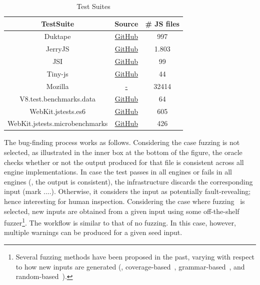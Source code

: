 \documentclass[10pt,conference,anonymous]{IEEEtran}
\begin{document}
\begin{table}[h]
  \centering
  \caption{\label{tab:test-suites}Test Suites}
  \begin{tabular}{ccc}
    \toprule
    TestSuite & Source & \# JS files \\
    \midrule
    Duktape & \href{https://github.com/svaarala/duktape}{GitHub} & 997 \\
    JerryJS & \href{https://github.com/jerryscript-project/jerryscript}{GitHub} & 1.803 \\
    JSI & \href{https://github.com/technosaurus/jsish}{GitHub} & 99 \\
    Tiny-js & \href{https://github.com/gfwilliams/tiny-js}{GitHub} & 44 \\
    Mozilla & \href{-}{-} & 32414 \\
    V8.test.benchmarks.data & \href{https://github.com/svaarala/duktape/tree/master/tests/ecmascript}{GitHub} & 64 \\
    WebKit.jstests.es6 & \href{https://github.com/svaarala/duktape/tree/master/tests/ecmascript}{GitHub} & 605 \\
    WebKit.jstests.microbenchmarks & \href{https://github.com/svaarala/duktape/tree/master/tests/ecmascript}{GitHub} & 426 \\
   \bottomrule     
  \end{tabular}
\end{table}


The bug-finding process works as follows.  Considering the case
fuzzing is not selected, as illustrated in the inner box at the bottom
of the figure, the oracle checks whether or not the output produced
for that file is consistent across all engine implementations. In case
the test passes in all engines or fails in all engines (\ie{}, the
output is consistent), the infrastructure discards the corresponding
input (mark ....). Otherwise, it considers the input as potentially
fault-revealing; hence interesting for human inspection. Considering
the case where fuzzing~\cite{fuzz-testing-history} is selected, new
inputs are obtained from a given input using some off-the-shelf
fuzzer\footnote{Several fuzzing methods have been proposed in the
  past, varying with respect to how new inputs are generated (\eg{},
  coverage-based~\cite{afl,honggfuzz},
  grammar-based~\cite{grammarinator,jsfunfuzz}, and
  random-based~\cite{radamsa}).}. The workflow is similar to that of
no fuzzing. In this case, however, multiple warnings can be produced
for a given seed input.
\end{document}
